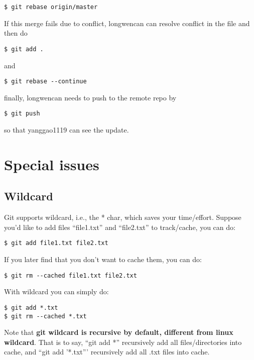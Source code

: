 \documentclass{article} %
\newcommand{\q}[1]{``#1''}
\begin{document}
\begin{lstlisting}
$ git rebase origin/master
\end{lstlisting}

If this merge fails due to conflict, longwencan can resolve conflict in the file and then do 

\begin{lstlisting}
$ git add .
\end{lstlisting}

and 

\begin{lstlisting}
$ git rebase --continue
\end{lstlisting}

finally, longwencan needs to push to the remote repo by

\begin{lstlisting}
$ git push
\end{lstlisting}

so that yanggao1119 can see the update.


\section{Special issues}

\subsection{Wildcard}

Git supports wildcard, i.e., the * char, which saves your time/effort. Suppose you'd like to add files \q{file1.txt} and \q{file2.txt} to track/cache, you can do:

\begin{lstlisting}
$ git add file1.txt file2.txt
\end{lstlisting}

If you later find that you don't want to cache them, you can do:

\begin{lstlisting}
$ git rm --cached file1.txt file2.txt
\end{lstlisting}

With wildcard you can simply do:

\begin{lstlisting}
$ git add *.txt
$ git rm --cached *.txt
\end{lstlisting}

Note that \textbf{git wildcard is recursive by default, different from linux wildcard}. That is to say, \q{git add *} recursively add all files/directories into cache, and \q{git add '*.txt'} recursively add all .txt files into cache.
\end{document}
